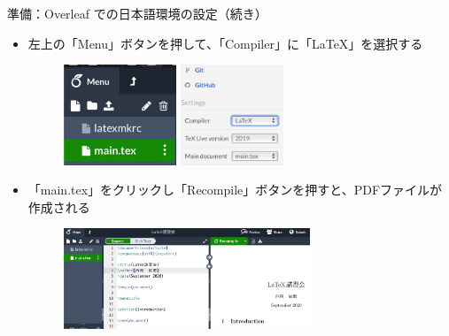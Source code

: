 \documentclass[dvipdfmx]{beamer}
\begin{document}
\begin{frame}{準備：Overleaf での日本語環境の設定（続き）}
\begin{itemize}
    \item 左上の「Menu」ボタンを押して、「Compiler」に「LaTeX」を選択する
    \begin{figure}
        \centering
        \includegraphics[height=3cm]{Menu.pdf}\qquad
        \includegraphics[height=3cm]{Compiler.pdf}
    \end{figure}
    \item 「main.tex」をクリックし「Recompile」ボタンを押すと、PDFファイルが作成される
    \begin{figure}
        \centering
        \includegraphics[height=3cm]{fig_preview.pdf}
    \end{figure}
\end{itemize}
\end{frame}
\end{document}
